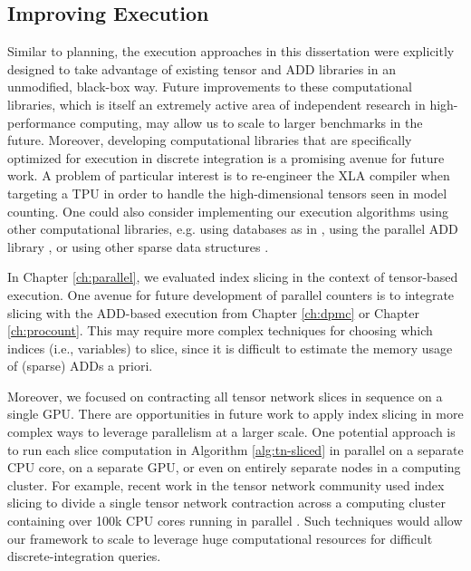 \subsection{Improving Execution}
Similar to planning, the execution approaches in this dissertation were explicitly designed to take advantage of existing tensor and ADD libraries in an unmodified, black-box way.
Future improvements to these computational libraries, which is itself an extremely active area of independent research in high-performance computing, may allow us to scale to larger benchmarks in the future.
Moreover, developing computational libraries that are specifically optimized for execution in discrete integration is a promising avenue for future work.
A problem of particular interest is to re-engineer the XLA compiler when targeting a TPU in order to handle the high-dimensional tensors seen in model counting.
One could also consider implementing our execution algorithms using other computational libraries, e.g. using databases as in \cite{fichte2020exploiting}, using the parallel ADD library \sylvan{} \cite{van2015sylvan}, or using other sparse data structures \cite{sanner2005affine,baskaran2012efficient,li2018hicoo}.

In Chapter \ref{ch:parallel}, we evaluated index slicing in the context of tensor-based execution.
One avenue for future development of parallel counters is to integrate slicing with the ADD-based execution from Chapter \ref{ch:dpmc} or Chapter \ref{ch:procount}.
This may require more complex techniques for choosing which indices (i.e., variables) to slice, since it is difficult to estimate the memory usage of (sparse) ADDs a priori.

Moreover, we focused on contracting all tensor network slices in sequence on a single GPU.
There are opportunities in future work to apply index slicing in more complex ways to leverage parallelism at a larger scale. 
One potential approach is to run each slice computation in Algorithm \ref{alg:tn-sliced} in parallel on a separate CPU core, on a separate GPU, or even on entirely separate nodes in a computing cluster.
For example, recent work in the tensor network community used index slicing to divide a single tensor network contraction across a computing cluster containing over 100k CPU cores running in parallel \cite{CZHNS18}.
Such techniques would allow our framework to scale to leverage huge computational resources for difficult discrete-integration queries.


